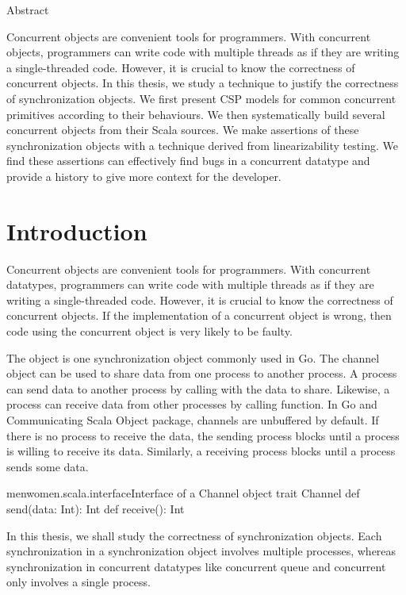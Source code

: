 \documentclass[a4paper, 12pt]{article}
\begin{document}
Abstract

Concurrent objects are convenient tools for programmers. With concurrent objects, programmers can write code with multiple threads as if they are writing a single-threaded code. However, it is crucial to know the correctness of concurrent objects. In this thesis, we study a technique to justify the correctness of synchronization objects. We first present CSP models for common concurrent primitives according to their behaviours. We then systematically build several concurrent objects from their Scala sources. We make assertions of these synchronization objects with a technique derived from linearizability testing. We find these assertions can effectively find bugs in a concurrent datatype and provide a history to give more context for the developer. 

\newpage


\tableofcontents
\newpage
\clearpage
\setcounter{page}{1}
\section{Introduction}
Concurrent objects are convenient tools for programmers. With concurrent datatypes, programmers can write code with multiple threads as if they are writing a single-threaded code. However, it is crucial to know the correctness of concurrent objects. If the implementation of a concurrent object is wrong, then code using the concurrent object is very likely to be faulty. 

The  object is one synchronization object commonly used in Go. The channel object can be used to share data from one process to another process. A process can send data to another process by calling  with the data to share. Likewise, a process can receive data from other processes by calling  function. In Go and Communicating Scala Object package, channels are unbuffered by default. If there is no process to receive the data, the sending process blocks until a process is willing to receive its data. Similarly, a receiving process blocks until a process sends some data. 

\begin{scalafloat}{menwomen.scala.interface}{Interface of a Channel object}
trait Channel{
  def send(data: Int): Int
  def receive(): Int
}
\end{scalafloat}

In this thesis, we shall study the correctness of synchronization objects. Each synchronization in a synchronization object involves multiple processes, whereas synchronization in concurrent datatypes like concurrent queue and concurrent only involves a single process. 
\end{document}
